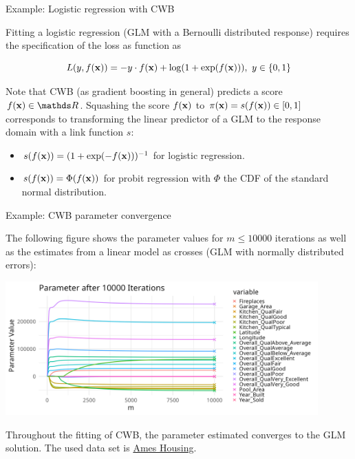 \documentclass[11pt,compress,t,notes=noshow, xcolor=table]{beamer}
\begin{document}

\begin{vbframe}{Example: Logistic regression with CWB}

Fitting a logistic regression (GLM with a Bernoulli distributed response) requires the specification of the loss as function as

$$
  L(y, f(\mathbf{x})) = -y \cdot f(\mathbf{x}) + \log (1 + \exp(f(\mathbf{x}))),\ y\in\{0, 1\}
$$

Note that CWB (as gradient boosting in general) predicts a score $\fx \in \R$. Squashing the score $f(\mathbf{x})$ to $\pi(\mathbf{x}) = s(f(\mathbf{x})) \in [0,1]$ corresponds to transforming the linear predictor of a GLM to the response domain with a link function $s$:

\begin{itemize}
  \item $s(f(\mathbf{x})) = (1 + \exp(-f(\mathbf{x})))^{-1}$ for logistic regression.
  \item $s(f(\mathbf{x})) = \Phi(f(\mathbf{x}))$ for probit regression with $\Phi$ the CDF of the standard normal distribution.
\end{itemize}

\end{vbframe}



\begin{vbframe}{Example: CWB parameter convergence}

The following figure shows the parameter values for $m \leq 10000$ iterations as well as the estimates from a linear model as crosses (GLM with normally distributed errors):

\begin{center}
\includegraphics[width=0.9\textwidth]{figure/compboost-to-glm-iter10000.png}
\end{center}

Throughout the fitting of CWB, the parameter estimated converges to the GLM solution. The used data set is \href{https://github.com/topepo/AmesHousing}{Ames Housing}.

\end{vbframe}


\endlecture
\end{document}
